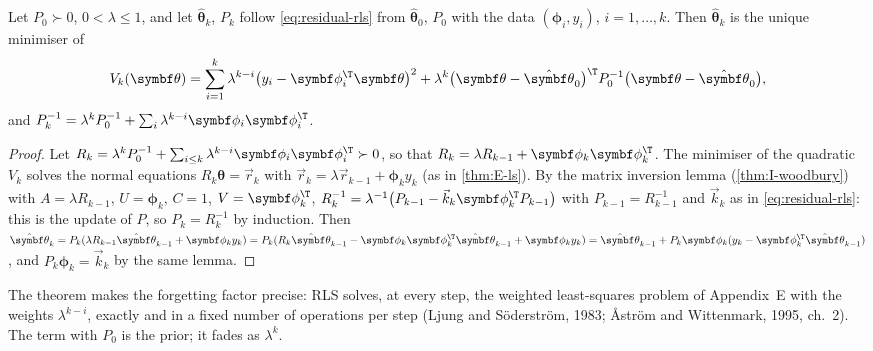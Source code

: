 \begin{theorem}
\label{thm:residual-rls}
Let $P_0 \succ 0$, $0 < \lambda \le 1$, and let $\hat{\symbf\theta}_k$, $P_k$ follow \cref{eq:residual-rls} from $\hat{\symbf\theta}_0$, $P_0$ with the data $(\symbf\phi_i, y_i)$, $i = 1, \dots, k$. Then $\hat{\symbf\theta}_k$ is the unique minimiser of
\begin{equation}\label{eq:residual-cost}
  V_k(\symbf\theta) = \sum_{i=1}^{k}\lambda^{k-i}\big(y_i - \symbf\phi_i^\T\symbf\theta\big)^2 + \lambda^k\big(\symbf\theta - \hat{\symbf\theta}_0\big)^\T P_0^{-1}\big(\symbf\theta - \hat{\symbf\theta}_0\big),
\end{equation}
and $P_k^{-1} = \lambda^kP_0^{-1} + \sum_i\lambda^{k-i}\symbf\phi_i\symbf\phi_i^\T$.
\end{theorem}
\begin{proof}
Let $R_k = \lambda^kP_0^{-1} + \sum_{i \le k}\lambda^{k-i}\symbf\phi_i\symbf\phi_i^\T \succ 0$, so that $R_k = \lambda R_{k-1} + \symbf\phi_k\symbf\phi_k^\T$. The minimiser of the quadratic $V_k$ solves the normal equations $R_k\symbf\theta = \vec r_k$ with $\vec r_k = \lambda\vec r_{k-1} + \symbf\phi_ky_k$ (as in \cref{thm:E-ls}). By the matrix inversion lemma (\cref{thm:I-woodbury}) with $A = \lambda R_{k-1}$, $U = \symbf\phi_k$, $C = 1$, $V = \symbf\phi_k^\T$, $R_k^{-1} = \lambda^{-1}\big(P_{k-1} - \vec k_k\symbf\phi_k^\T P_{k-1}\big)$ with $P_{k-1} = R_{k-1}^{-1}$ and $\vec k_k$ as in \cref{eq:residual-rls}: this is the update of $P$, so $P_k = R_k^{-1}$ by induction. Then $\hat{\symbf\theta}_k = P_k(\lambda R_{k-1}\hat{\symbf\theta}_{k-1} + \symbf\phi_ky_k) = P_k(R_k\hat{\symbf\theta}_{k-1} - \symbf\phi_k\symbf\phi_k^\T\hat{\symbf\theta}_{k-1} + \symbf\phi_ky_k) = \hat{\symbf\theta}_{k-1} + P_k\symbf\phi_k(y_k - \symbf\phi_k^\T\hat{\symbf\theta}_{k-1})$, and $P_k\symbf\phi_k = \vec k_k$ by the same lemma.
\end{proof}

The theorem makes the forgetting factor precise: RLS solves, at every step, the weighted least-squares problem of Appendix~E with the weights $\lambda^{k-i}$, exactly and in a fixed number of operations per step (Ljung and Söderström, 1983; Åström and Wittenmark, 1995, ch.~2). The term with $P_0$ is the prior; it fades as $\lambda^k$.

